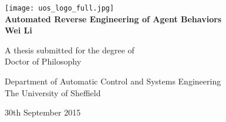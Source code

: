 \begin{titlepage}
\begin{center}


\texttt{[image: uos\_logo\_full.jpg]}~\\[3.0cm]

\textsf{{\Huge \bfseries Automated Reverse Engineering of Agent Behaviors}}~\\[1cm]

\textsf{{\Large \bfseries Wei Li}}~\\[3.5cm]


%

	\vspace{1.0cm}
	
	{\Large A thesis submitted for the degree of\\Doctor of Philosophy}
	
	\vspace{1.0cm}
	
	
	{\Large Department of Automatic Control and Systems Engineering}\\
	\vspace{0.2cm}
	{\Large The University of Sheffield}\\
	
	\vfill
	
	{\Large 30th September 2015}
	

\end{center}
\end{titlepage}

